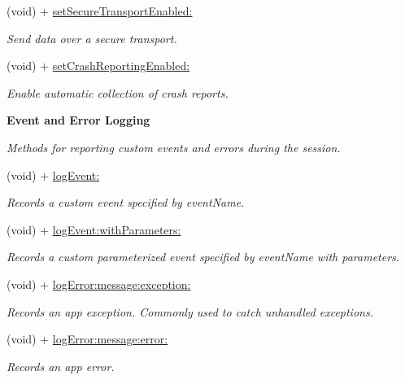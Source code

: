 \begin{Indent}
\begin{DoxyCompactItemize}
(void) + \hyperlink{interfaceFlurry_a085d6860e85344caa6c7ee201f2bc953}{set\+Secure\+Transport\+Enabled\+:}
\begin{DoxyCompactList}\small\item\em Send data over a secure transport. \end{DoxyCompactList}\item 
(void) + \hyperlink{interfaceFlurry_a20dbc3ff9cc3c114aad7e7713547dfe1}{set\+Crash\+Reporting\+Enabled\+:}
\begin{DoxyCompactList}\small\item\em Enable automatic collection of crash reports. \end{DoxyCompactList}\end{DoxyCompactItemize}
\end{Indent}
\begin{Indent}\textbf{ Event and Error Logging}\par
{\em Methods for reporting custom events and errors during the session. }\begin{DoxyCompactItemize}
\item 
(void) + \hyperlink{interfaceFlurry_a5433aaf247d3e14120ba05877d034a61}{log\+Event\+:}
\begin{DoxyCompactList}\small\item\em Records a custom event specified by {\ttfamily event\+Name}. \end{DoxyCompactList}\item 
(void) + \hyperlink{interfaceFlurry_a655ffe3bf02112f3af25414397ded072}{log\+Event\+:with\+Parameters\+:}
\begin{DoxyCompactList}\small\item\em Records a custom parameterized event specified by {\ttfamily event\+Name} with {\ttfamily parameters}. \end{DoxyCompactList}\item 
(void) + \hyperlink{interfaceFlurry_aab0b2c1426b3a120e54613fd47e6719e}{log\+Error\+:message\+:exception\+:}
\begin{DoxyCompactList}\small\item\em Records an app exception. Commonly used to catch unhandled exceptions. \end{DoxyCompactList}\item 
(void) + \hyperlink{interfaceFlurry_a54e3619abb7f17c9b2a8f01c33cdfd81}{log\+Error\+:message\+:error\+:}
\begin{DoxyCompactList}\small\item\em Records an app error. \end{DoxyCompactList}\item 

\end{DoxyCompactItemize}
\end{Indent}
